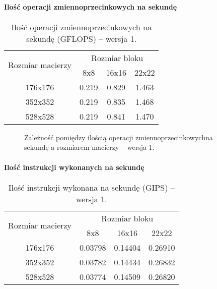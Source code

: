 \paragraph{Ilość operacji zmiennoprzecinkowych na sekundę}

\begin{table}[H]
\centering
\begin{tabular}{|c|c|c|c|}
\hline
\multirow{2}{*}{Rozmiar macierzy} & \multicolumn{3}{c|}{Rozmiar bloku} \\ \cline{2-4}
& 8x8 & 16x16 & 22x22 \\ \hline
176x176 & 0.219 & 0.829 & 1.463 \\ \hline
352x352 & 0.219 & 0.835 & 1.468 \\ \hline
528x528 & 0.219 & 0.841 & 1.470 \\ \hline
\end{tabular}
\caption{Ilość operacji zmiennoprzecinkowych na sekundę (GFLOPS) -- wersja 1.}
\end{table}

\begin{figure}[H]
\centering
\caption{Zależność pomiędzy ilością operacji zmiennoprzecinkowychna sekundę a rozmiarem macierzy -- wersja 1.}
\end{figure}


\paragraph{Ilość instrukcji wykonanych na sekundę}

\begin{table}[H]
\centering
\begin{tabular}{|c|c|c|c|}
\hline
\multirow{2}{*}{Rozmiar macierzy} & \multicolumn{3}{c|}{Rozmiar bloku} \\ \cline{2-4}
& 8x8 & 16x16 & 22x22 \\ \hline
176x176 & 0.03798 & 0.14404 & 0.26910 \\ \hline
352x352 & 0.03782 & 0.14434 & 0.26832 \\ \hline
528x528 & 0.03774 & 0.14509 & 0.26820 \\ \hline
\end{tabular}
\caption{Ilość instrukcji wykonana na sekundę (GIPS) -- wersja 1.}
\end{table}

